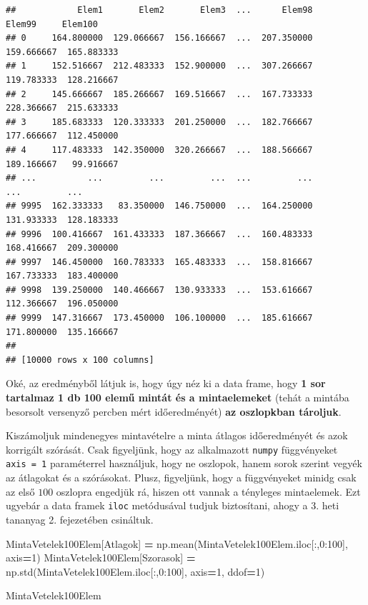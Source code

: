 \documentclass[
]{book}
\newenvironment{Shaded}{\begin{snugshade}}{\end{snugshade}}
\newcommand{\DecValTok}[1]{\textcolor[rgb]{0.00,0.00,0.81}{#1}}
\newcommand{\NormalTok}[1]{#1}
\newcommand{\OperatorTok}[1]{\textcolor[rgb]{0.81,0.36,0.00}{\textbf{#1}}}
\newcommand{\StringTok}[1]{\textcolor[rgb]{0.31,0.60,0.02}{#1}}
\begin{document}
\begin{verbatim}
##            Elem1       Elem2       Elem3  ...      Elem98      Elem99     Elem100
## 0     164.800000  129.066667  156.166667  ...  207.350000  159.666667  165.883333
## 1     152.516667  212.483333  152.900000  ...  307.266667  119.783333  128.216667
## 2     145.666667  185.266667  169.516667  ...  167.733333  228.366667  215.633333
## 3     185.683333  120.333333  201.250000  ...  182.766667  177.666667  112.450000
## 4     117.483333  142.350000  320.266667  ...  188.566667  189.166667   99.916667
## ...          ...         ...         ...  ...         ...         ...         ...
## 9995  162.333333   83.350000  146.750000  ...  164.250000  131.933333  128.183333
## 9996  100.416667  161.433333  187.366667  ...  160.483333  168.416667  209.300000
## 9997  146.450000  160.783333  165.483333  ...  158.816667  167.733333  183.400000
## 9998  139.250000  140.466667  130.933333  ...  153.616667  112.366667  196.050000
## 9999  147.316667  173.450000  106.100000  ...  185.616667  171.800000  135.166667
## 
## [10000 rows x 100 columns]
\end{verbatim}

Oké, az eredményből látjuk is, hogy úgy néz ki a data frame, hogy \textbf{1 sor tartalmaz 1 db 100 elemű mintát és a mintaelemeket} (tehát a mintába besorsolt versenyző percben mért időeredményét) \textbf{az oszlopkban tároljuk}.

Kiszámoljuk mindenegyes mintavételre a minta átlagos időeredményét és azok korrigált szórását. Csak figyeljünk, hogy az alkalmazott \texttt{numpy} függvényeket \texttt{axis\ =\ 1} paraméterrel használjuk, hogy ne oszlopok, hanem sorok szerint vegyék az átlagokat és a szórásokat. Plusz, figyeljünk, hogy a függvényeket minidg csak az első \(100\) oszlopra engedjük rá, hiszen ott vannak a tényleges mintaelemek. Ezt ugyebár a data framek \texttt{iloc} metódusával tudjuk biztosítani, ahogy a 3. heti tananyag 2. fejezetében csináltuk.

\begin{Shaded}
\begin{Highlighting}[]
\NormalTok{MintaVetelek100Elem[}\StringTok{\textquotesingle{}Atlagok\textquotesingle{}}\NormalTok{] }\OperatorTok{=}\NormalTok{ np.mean(MintaVetelek100Elem.iloc[:,}\DecValTok{0}\NormalTok{:}\DecValTok{100}\NormalTok{], axis}\OperatorTok{=}\DecValTok{1}\NormalTok{)}
\NormalTok{MintaVetelek100Elem[}\StringTok{\textquotesingle{}Szorasok\textquotesingle{}}\NormalTok{] }\OperatorTok{=}\NormalTok{ np.std(MintaVetelek100Elem.iloc[:,}\DecValTok{0}\NormalTok{:}\DecValTok{100}\NormalTok{], axis}\OperatorTok{=}\DecValTok{1}\NormalTok{, ddof}\OperatorTok{=}\DecValTok{1}\NormalTok{)}

\NormalTok{MintaVetelek100Elem}
\end{Highlighting}
\end{Shaded}
\end{document}
